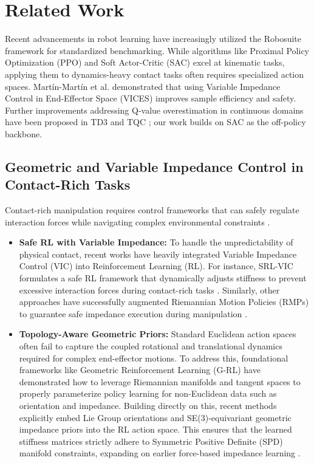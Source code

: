 \documentclass[letterpaper, 10 pt, conference]{IEEEtran}
\begin{document}
\section{Related Work}
Recent advancements in robot learning have increasingly utilized the Robosuite framework \cite{zhu2020robosuite} for standardized benchmarking. While algorithms like Proximal Policy Optimization (PPO) \cite{schulman2017proximal} and Soft Actor-Critic (SAC) \cite{haarnoja2018soft} excel at kinematic tasks, applying them to dynamics-heavy contact tasks often requires specialized action spaces. Martín-Martín et al. \cite{martin2019variable} demonstrated that using Variable Impedance Control in End-Effector Space (VICES) improves sample efficiency and safety. Further improvements addressing Q-value overestimation in continuous domains have been proposed in TD3 \cite{fujimoto2018addressing} and TQC \cite{kuznetsov2020controlling}; our work builds on SAC as the off-policy backbone.

\subsection{Geometric and Variable Impedance Control in Contact-Rich Tasks}
Contact-rich manipulation requires control frameworks that can safely regulate interaction forces while navigating complex environmental constraints \cite{pu2024safe}. 
\begin{itemize}
    \item \textbf{Safe RL with Variable Impedance:} To handle the unpredictability of physical contact, recent works have heavily integrated Variable Impedance Control (VIC) \cite{martin2019variable} into Reinforcement Learning (RL). For instance, SRL-VIC formulates a safe RL framework that dynamically adjusts stiffness to prevent excessive interaction forces during contact-rich tasks \cite{srlvic2024}. Similarly, other approaches have successfully augmented Riemannian Motion Policies (RMPs) \cite{ratliff2018riemannian} to guarantee safe impedance execution during manipulation \cite{rmp_impedance2023}.
    \item \textbf{Topology-Aware Geometric Priors:} Standard Euclidean action spaces often fail to capture the coupled rotational and translational dynamics required for complex end-effector motions. To address this, foundational frameworks like Geometric Reinforcement Learning (G-RL) \cite{alhousani2023geometric} have demonstrated how to leverage Riemannian manifolds and tangent spaces to properly parameterize policy learning for non-Euclidean data such as orientation and impedance. Building directly on this, recent methods explicitly embed Lie Group orientations \cite{liegroupRL2024} and SE(3)-equivariant geometric impedance priors \cite{se3geometric2023} into the RL action space. This ensures that the learned stiffness matrices strictly adhere to Symmetric Positive Definite (SPD) manifold constraints, expanding on earlier force-based impedance learning \cite{abudakka2018force}.
\end{itemize}
\end{document}
